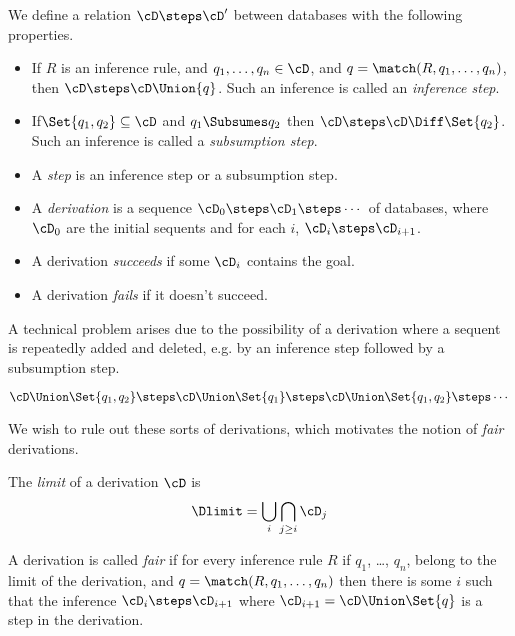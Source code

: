 \begin{definition}
  We define a relation $\cD\steps\cD'$ between databases with the following
  properties.
  \begin{itemize}
  \item If $R$ is an inference rule,
    and $q_1, \ldots, q_n\in\cD$, and $q = \match(R, q_1,\ldots, q_n)$, then
    $\cD\steps\cD\Union{q}$.  Such an inference is called an
    \emph{inference step}.

  \item If$\Set{q_1,q_2}\subseteq\cD$ and  $q_1\Subsumes q_2$
    then $\cD\steps\cD\Diff\Set{q_2}$.
    Such an inference is called a \emph{subsumption step}.

  \item A \emph{step} is an inference step or a subsumption step.

  \item A \emph{derivation} is a sequence $\cD_0\steps\cD_1\steps\cdots$
    of databases, where $\cD_0$
    are the initial sequents and for each $i$, $\cD_i\steps\cD_{i+1}$.

  \item A derivation \emph{succeeds} if some $\cD_i$ contains the goal.
  \item A derivation \emph{fails} if it doesn't succeed.
  \end{itemize}
\end{definition}

\noindent
A technical problem arises due to the possibility of a derivation where
a sequent is repeatedly added and deleted, e.g. by an inference step followed
by a subsumption step.

\[
\cD\Union\Set{q_1,q_2}\steps\cD\Union\Set{q_1}\steps\cD\Union\Set{q_1,q_2}\steps\cdots
\]

\noindent We wish to rule out these sorts of derivations, which motivates the
notion of \emph{fair} derivations.

\begin{definition}
  The \emph{limit} of a derivation $\cD$ is
  \[
  \Dlimit = \bigcup_i\bigcap_{j\geq i}\cD_j
  \]

  \noindent
  A derivation is called \emph{fair} if for every inference rule $R$
  if $q_1$, \ldots, $q_n$, belong to the limit of the derivation, and
  $q = \match(R, q_1, \ldots, q_n)$ then there is some $i$ such that
  the inference $\cD_i\steps\cD_{i+1}$ where $\cD_{i+1}=\cD\Union\Set{q}$
  is a step in the derivation.
\end{definition}

